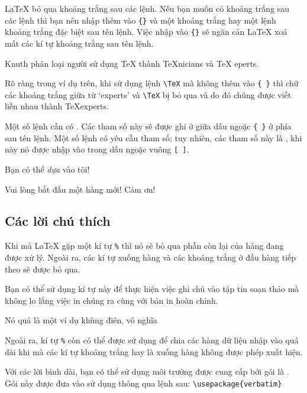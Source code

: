 \LaTeX{} bỏ qua khoảng trắng sau các lệnh. Nếu bạn muốn có khoảng trắng sau các lệnh thì bạn nên nhập thêm vào \verb|{}| và một khoảng trắng hay một lệnh khoảng trắng đặc biệt sau tên lệnh. Việc nhập vào \verb|{}| sẽ ngăn cản \LaTeX{} xoá mất các kí tự khoảng trắng sau tên lệnh.

\begin{example}
Knuth phân loại người
sử dụng \TeX{} thành
\TeX{}nicians
và \TeX
 eperts.
\end{example}
Rõ ràng trong ví dụ trên, khi sử dụng lệnh \verb|\TeX| mà không thêm vào \verb|{ }| thì chữ các khoảng trắng giữa từ `experts' và \verb|\TeX| bị bỏ qua và do đó chúng được viết liền nhau thành \TeX{}experts.

Một số lệnh cần có . Các tham số này sẽ được ghi ở
giữa dấu ngoặc \verb|{ }| ở phía sau tên lệnh. Một số lệnh có yêu
cầu tham số; tuy nhiên, các tham số này là , khi này nó được
nhập vào trong dấu ngoặc vuông \verb|[ ]|.

\begin{example}
Bạn có thể \textsl{dựa} vào tôi!
\end{example}

\begin{example}
Vui lòng bắt đầu một
hàng mới!\newline
Cám ơn!
\end{example}

\subsection{Các lời chú thích} 
Khi mà \LaTeX{} gặp một kí tự \verb|%| thì nó sẽ bỏ qua phần còn lại của hàng đang được xử lý. Ngoài ra, các kí tự xuống hàng và các khoảng trắng ở đầu hàng tiếp theo sẽ được bỏ qua.

Bạn có thể sử dụng kí tự này để thực hiện việc ghi chú vào tập tin soạn thảo mà không lo lắng việc in chúng ra cùng với bản in hoàn chỉnh.

\begin{example}
Nó quả là %
một ví dụ khùng điên,
        vô nghĩa
\end{example}

Ngoài ra, kí tự \texttt{\%} còn có thể được sử dụng để chia các hàng dữ liệu
nhập vào quá dài khi mà các kí tự khoảng trắng hay là xuống hàng
không được phép xuất hiện.

Với các lời bình dài, bạn có thể sử dụng môi trường được cung cấp
bởi gói  là . Gói này được đưa vào sử dụng thông qua lệnh sau:  \verb|\usepackage{verbatim}| 

